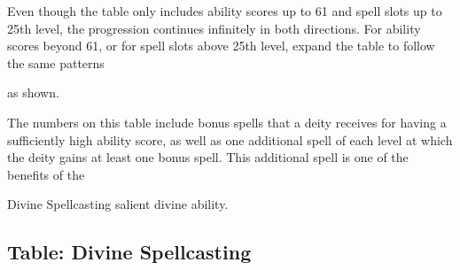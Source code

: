 \documentclass{article}
\begin{document}
Even though the table only includes ability scores up to 61 and spell slots up 
to 25th level, the progression continues infinitely in both directions. For ability 
scores beyond 61, or for spell slots above 25th level, expand the table to follow 
the same patterns

as shown.

The numbers on this table include bonus spells that a deity receives for having 
a sufficiently high ability score, as well as one additional spell of each level 
at which the deity gains at least one bonus spell. This additional spell is one 
of the benefits of the

Divine Spellcasting salient divine ability. 

\vspace{12pt}
\subsection*{\textbf{Table: Divine Spellcasting}}
\end{document}
